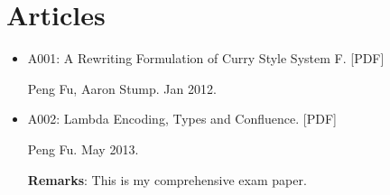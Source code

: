 \documentclass[10pt]{article}
\begin{document}
\section*{Articles}

\begin{itemize}
\item A001: A Rewriting Formulation of Curry Style System F. [PDF]

\noindent Peng Fu, Aaron Stump. Jan 2012.

\item A002: Lambda Encoding, Types and Confluence. [PDF]

\noindent Peng Fu. May 2013.

\noindent \textbf{Remarks}: This is my comprehensive exam paper. 


\end{itemize}
\end{document}
